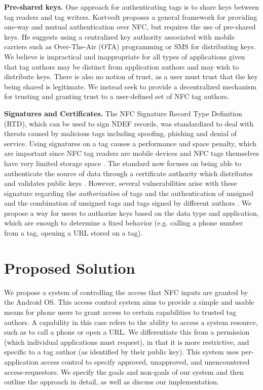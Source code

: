 \documentclass[12pt]{article}
\begin{document}
\textbf{Pre-shared keys.}
One approach for authenticating tags is to share keys between tag readers and tag writers.
Kortvedt \cite{kortvedt2009} proposes a general framework for providing one-way and mutual authentication over NFC, but requires the use of pre-shared keys.
He suggests using a centralized key authority associated with mobile carriers such as Over-The-Air (OTA) programming or SMS for distributing keys.
We believe is impractical and inappropriate for all types of applications given that tag authors may be distinct from application authors and may wish to distribute keys.
There is also no notion of trust, as a user must trust that the key being shared is legitimate.
We instead seek to provide a decentralized mechanism for trusting and granting trust to a user-defined set of NFC tag authors.

\textbf{Signatures and Certificates.}
The NFC Signature Record Type Definition (RTD), which can be used to sign NDEF records, was standardized to deal with threats caused by malicious tags including spoofing, phishing and denial of service.
Using signatures on a tag causes a performance and space penalty, which are important since NFC tag readers are mobile devices and NFC tags themselves have very limited storage space \cite{kilas2009}.
The standard now focuses on being able to authenticate the source of data through a certificate authority which distributes and validates public keys \cite{rosati2011}.
However, several vulnerabilities arise with these signature regarding the \textit{authorization} of tags and the authentication of unsigned and the combination of unsigned tags and tags signed by different authors \cite{roland2010,roland2011}.
We propose a way for users to authorize keys based on the data type and application, which are enough to determine a fixed behavior (e.g. calling a phone number from a tag, opening a URL stored on a tag).


\section{Proposed Solution}
We propose a system of controlling the access that NFC inputs are granted by the Android OS.
This access control system aims to provide a simple and usable means for phone users to grant access to certain capabilities to trusted tag authors.
A capability in this case refers to the ability to access a system resource, such as to call a phone or open a URL.
We differentiate this from a permission (which individual applications must request), in that it is more restrictive, and specific to a tag author (as identified by their public key).
This system uses per-application access control to specify approved, unapproved, and unencountered access-requestors.
We specify the goals and non-goals of our system and then outline the approach in detail, as well as discuss our implementation.
\end{document}

